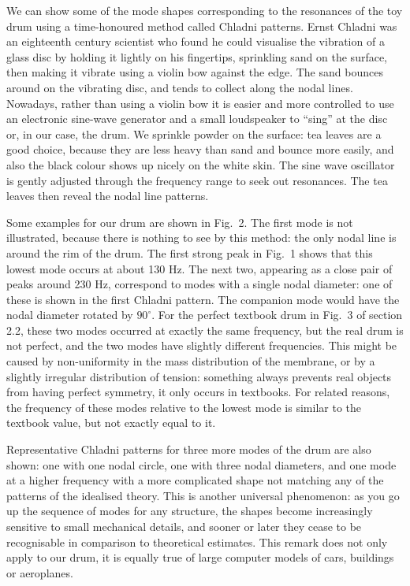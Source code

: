   We can show some of the mode shapes corresponding to the resonances of the 
  toy drum using a time-honoured method called Chladni patterns. Ernst Chladni 
  was an eighteenth century scientist who found he could visualise the 
  vibration of a glass disc by holding it lightly on his fingertips, sprinkling 
  sand on the surface, then making it vibrate using a violin bow against the 
  edge. The sand bounces around on the vibrating disc, and tends to collect 
  along the nodal lines. Nowadays, rather than using a violin bow it is easier 
  and more controlled to use an electronic sine-wave generator and a small 
  loudspeaker to ``sing'' at the disc or, in our case, the drum. We sprinkle 
  powder on the surface: tea leaves are a good choice, because they are less 
  heavy than sand and bounce more easily, and also the black colour shows up 
  nicely on the white skin. The sine wave oscillator is gently adjusted through 
  the frequency range to seek out resonances. The tea leaves then reveal the 
  nodal line patterns. 

  Some examples for our drum are shown in Fig.\ 2. The first mode is not 
  illustrated, because there is nothing to see by this method: the only nodal 
  line is around the rim of the drum. The first strong peak in Fig.\ 1 shows 
  that this lowest mode occurs at about 130 Hz. The next two, appearing as a 
  close pair of peaks around 230 Hz, correspond to modes with a single nodal 
  diameter: one of these is shown in the first Chladni pattern. The companion 
  mode would have the nodal diameter rotated by $90^\circ$. For the perfect 
  textbook drum in Fig.\ 3 of section 2.2, these two modes occurred at exactly 
  the same frequency, but the real drum is not perfect, and the two modes have 
  slightly different frequencies. This might be caused by non-uniformity in the 
  mass distribution of the membrane, or by a slightly irregular distribution of 
  tension: something always prevents real objects from having perfect symmetry, 
  it only occurs in textbooks. For related reasons, the frequency of these 
  modes relative to the lowest mode is similar to the textbook value, but not 
  exactly equal to it. 





  Representative Chladni patterns for three more modes of the drum are also 
  shown: one with one nodal circle, one with three nodal diameters, and one 
  mode at a higher frequency with a more complicated shape not matching any of 
  the patterns of the idealised theory. This is another universal phenomenon: 
  as you go up the sequence of modes for any structure, the shapes become 
  increasingly sensitive to small mechanical details, and sooner or later they 
  cease to be recognisable in comparison to theoretical estimates. This remark 
  does not only apply to our drum, it is equally true of large computer models 
  of cars, buildings or aeroplanes. 

